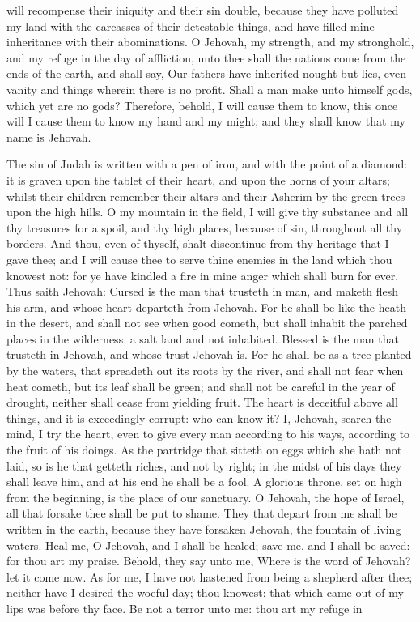 will recompense their iniquity and their sin double, because they have polluted my land with the carcasses of their detestable things, and have filled mine inheritance with their abominations.  O Jehovah, my strength, and my stronghold, and my refuge in the day of affliction, unto thee shall the nations come from the ends of the earth, and shall say, Our fathers have inherited nought but lies, even vanity and things wherein there is no profit. Shall a man make unto himself gods, which yet are no gods?  Therefore, behold, I will cause them to know, this once will I cause them to know my hand and my might; and they shall know that my name is Jehovah. 

The sin of Judah is written with a pen of iron, and with the point of a diamond: it is graven upon the tablet of their heart, and upon the horns of your altars; whilst their children remember their altars and their Asherim by the green trees upon the high hills. O my mountain in the field, I will give thy substance and all thy treasures for a spoil, and thy high places, because of sin, throughout all thy borders. And thou, even of thyself, shalt discontinue from thy heritage that I gave thee; and I will cause thee to serve thine enemies in the land which thou knowest not: for ye have kindled a fire in mine anger which shall burn for ever.  Thus saith Jehovah: Cursed is the man that trusteth in man, and maketh flesh his arm, and whose heart departeth from Jehovah. For he shall be like the heath in the desert, and shall not see when good cometh, but shall inhabit the parched places in the wilderness, a salt land and not inhabited. Blessed is the man that trusteth in Jehovah, and whose trust Jehovah is. For he shall be as a tree planted by the waters, that spreadeth out its roots by the river, and shall not fear when heat cometh, but its leaf shall be green; and shall not be careful in the year of drought, neither shall cease from yielding fruit.  The heart is deceitful above all things, and it is exceedingly corrupt: who can know it? I, Jehovah, search the mind, I try the heart, even to give every man according to his ways, according to the fruit of his doings. As the partridge that sitteth on eggs which she hath not laid, so is he that getteth riches, and not by right; in the midst of his days they shall leave him, and at his end he shall be a fool.  A glorious throne, set on high from the beginning, is the place of our sanctuary. O Jehovah, the hope of Israel, all that forsake thee shall be put to shame. They that depart from me shall be written in the earth, because they have forsaken Jehovah, the fountain of living waters. Heal me, O Jehovah, and I shall be healed; save me, and I shall be saved: for thou art my praise. Behold, they say unto me, Where is the word of Jehovah? let it come now. As for me, I have not hastened from being a shepherd after thee; neither have I desired the woeful day; thou knowest: that which came out of my lips was before thy face. Be not a terror unto me: thou art my refuge in 